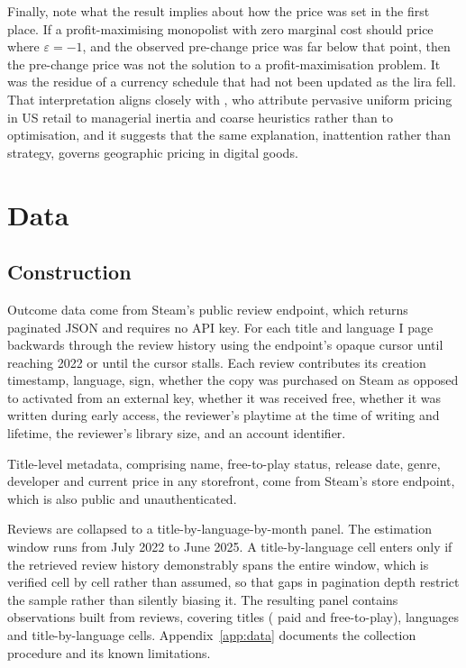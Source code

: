 \documentclass[11pt]{article}
\begin{document}
Finally, note what the result implies about how the price was set in the first place. If a
profit-maximising monopolist with zero marginal cost should price where $\varepsilon = -1$, and the
observed pre-change price was far below that point, then the pre-change price was not the solution
to a profit-maximisation problem. It was the residue of a currency schedule that had not been
updated as the lira fell. That interpretation aligns closely with \citet{dellavigna2019}, who
attribute pervasive uniform pricing in US retail to managerial inertia and coarse heuristics rather
than to optimisation, and it suggests that the same explanation, inattention rather than strategy,
governs geographic pricing in digital goods.

\section{Data}\label{sec:data}

\subsection{Construction}

Outcome data come from Steam's public review endpoint, which returns paginated JSON and requires
no API key. For each title and language I page backwards through the review history using the
endpoint's opaque cursor until reaching 2022 or until the cursor stalls. Each review contributes
its creation timestamp, language, sign, whether the copy was purchased on Steam as opposed to
activated from an external key, whether it was received free, whether it was written during early
access, the reviewer's playtime at the time of writing and lifetime, the reviewer's library size,
and an account identifier.

Title-level metadata, comprising name, free-to-play status, release date, genre, developer and
current price in any storefront, come from Steam's store endpoint, which is also public and
unauthenticated.

Reviews are collapsed to a title-by-language-by-month panel. The estimation window runs from July
2022 to June 2025. A title-by-language cell enters only if the retrieved review history
demonstrably spans the entire window, which is verified cell by cell rather than assumed, so that
gaps in pagination depth restrict the sample rather than silently biasing it. The resulting panel
contains \Nobs{} observations built from \Nreviews{} reviews, covering \Ngames{} titles (\Npaid{}
paid and \Nfree{} free-to-play), \Nlang{} languages and \Ncells{} title-by-language cells.
Appendix~\ref{app:data} documents the collection procedure and its known limitations.
\end{document}
